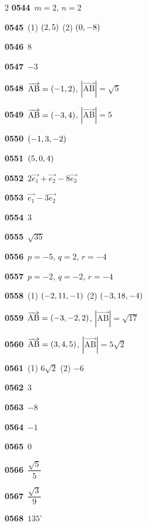 \documentclass[10pt,a4paper]{article}
\newcommand{\pt}[1]{\mathrm{#1}}
\begin{document}
\begin{multicols}{2}
\noindent\textbf{0544}\ $m=2$, $n=2$\par
\noindent\textbf{0545}\ (1) $(2{,}\mkern3mu\mathopen{}5)$ (2) $(0{,}\mkern3mu\mathopen{}-8)$\par
\noindent\textbf{0546}\ $8$\par
\noindent\textbf{0547}\ $-3$\par
\noindent\textbf{0548}\ $\overrightarrow{\pt{AB}}=(-1{,}\mkern3mu\mathopen{}2)$, $|\overrightarrow{\pt{AB}}|=\sqrt{5}$\par
\noindent\textbf{0549}\ $\overrightarrow{\pt{AB}}=(-3{,}\mkern3mu\mathopen{}4)$, $|\overrightarrow{\pt{AB}}|=5$\par
\noindent\textbf{0550}\ $(-1{,}\mkern3mu\mathopen{}3{,}\mkern3mu\mathopen{}-2)$\par
\noindent\textbf{0551}\ $(5{,}\mkern3mu\mathopen{}0{,}\mkern3mu\mathopen{}4)$\par
\noindent\textbf{0552}\ $2\vec{e_1}+\vec{e_2}-8\vec{e_3}$\par
\noindent\textbf{0553}\ $\vec{e_1}-3\vec{e_2}$\par
\noindent\textbf{0554}\ $3$\par
\noindent\textbf{0555}\ $\sqrt{35}$\par
\noindent\textbf{0556}\ $p=-5$, $q=2$, $r=-4$\par
\noindent\textbf{0557}\ $p=-2$, $q=-2$, $r=-4$\par
\noindent\textbf{0558}\ (1) $(-2{,}\mkern3mu\mathopen{}11{,}\mkern3mu\mathopen{}-1)$ (2) $(-3{,}\mkern3mu\mathopen{}18{,}\mkern3mu\mathopen{}-4)$\par
\noindent\textbf{0559}\ $\overrightarrow{\pt{AB}}=(-3{,}\mkern3mu\mathopen{}-2{,}\mkern3mu\mathopen{}2)$, $|\overrightarrow{\pt{AB}}|=\sqrt{17}$\par
\noindent\textbf{0560}\ $\overrightarrow{\pt{AB}}=(3{,}\mkern3mu\mathopen{}4{,}\mkern3mu\mathopen{}5)$, $|\overrightarrow{\pt{AB}}|=5\sqrt{2}$\par
\noindent\textbf{0561}\ (1) $6\sqrt{2}$ (2) $-6$\par
\noindent\textbf{0562}\ $3$\par
\noindent\textbf{0563}\ $-8$\par
\noindent\textbf{0564}\ $-1$\par
\noindent\textbf{0565}\ $0$\par
\noindent\textbf{0566}\ $\dfrac{\sqrt{5}}{5}$\par
\noindent\textbf{0567}\ $\dfrac{\sqrt{3}}{9}$\par
\noindent\textbf{0568}\ $135^\circ$\par

\end{multicols}
\end{document}
